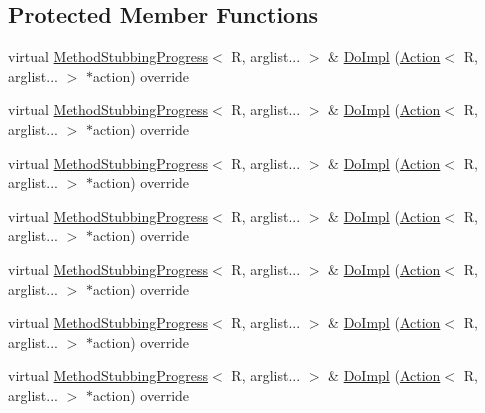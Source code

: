 \subsection*{Protected Member Functions}
\begin{DoxyCompactItemize}
\item 
virtual \mbox{\hyperlink{structfakeit_1_1MethodStubbingProgress}{Method\+Stubbing\+Progress}}$<$ R, arglist... $>$ \& \mbox{\hyperlink{structfakeit_1_1WhenFunctor_1_1MethodProgress_a4b8a947b1514fe715743ee8e65953d9d}{Do\+Impl}} (\mbox{\hyperlink{structfakeit_1_1Action}{Action}}$<$ R, arglist... $>$ $\ast$action) override
\item 
virtual \mbox{\hyperlink{structfakeit_1_1MethodStubbingProgress}{Method\+Stubbing\+Progress}}$<$ R, arglist... $>$ \& \mbox{\hyperlink{structfakeit_1_1WhenFunctor_1_1MethodProgress_a4b8a947b1514fe715743ee8e65953d9d}{Do\+Impl}} (\mbox{\hyperlink{structfakeit_1_1Action}{Action}}$<$ R, arglist... $>$ $\ast$action) override
\item 
virtual \mbox{\hyperlink{structfakeit_1_1MethodStubbingProgress}{Method\+Stubbing\+Progress}}$<$ R, arglist... $>$ \& \mbox{\hyperlink{structfakeit_1_1WhenFunctor_1_1MethodProgress_a4b8a947b1514fe715743ee8e65953d9d}{Do\+Impl}} (\mbox{\hyperlink{structfakeit_1_1Action}{Action}}$<$ R, arglist... $>$ $\ast$action) override
\item 
virtual \mbox{\hyperlink{structfakeit_1_1MethodStubbingProgress}{Method\+Stubbing\+Progress}}$<$ R, arglist... $>$ \& \mbox{\hyperlink{structfakeit_1_1WhenFunctor_1_1MethodProgress_a4b8a947b1514fe715743ee8e65953d9d}{Do\+Impl}} (\mbox{\hyperlink{structfakeit_1_1Action}{Action}}$<$ R, arglist... $>$ $\ast$action) override
\item 
virtual \mbox{\hyperlink{structfakeit_1_1MethodStubbingProgress}{Method\+Stubbing\+Progress}}$<$ R, arglist... $>$ \& \mbox{\hyperlink{structfakeit_1_1WhenFunctor_1_1MethodProgress_a4b8a947b1514fe715743ee8e65953d9d}{Do\+Impl}} (\mbox{\hyperlink{structfakeit_1_1Action}{Action}}$<$ R, arglist... $>$ $\ast$action) override
\item 
virtual \mbox{\hyperlink{structfakeit_1_1MethodStubbingProgress}{Method\+Stubbing\+Progress}}$<$ R, arglist... $>$ \& \mbox{\hyperlink{structfakeit_1_1WhenFunctor_1_1MethodProgress_a4b8a947b1514fe715743ee8e65953d9d}{Do\+Impl}} (\mbox{\hyperlink{structfakeit_1_1Action}{Action}}$<$ R, arglist... $>$ $\ast$action) override
\item 
virtual \mbox{\hyperlink{structfakeit_1_1MethodStubbingProgress}{Method\+Stubbing\+Progress}}$<$ R, arglist... $>$ \& \mbox{\hyperlink{structfakeit_1_1WhenFunctor_1_1MethodProgress_a4b8a947b1514fe715743ee8e65953d9d}{Do\+Impl}} (\mbox{\hyperlink{structfakeit_1_1Action}{Action}}$<$ R, arglist... $>$ $\ast$action) override

\end{DoxyCompactItemize}
